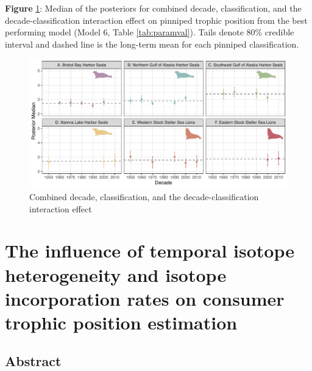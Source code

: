 \documentclass [11pt, proquest] {uwthesis}[2015/03/03]
\begin{document}
\textbf{Figure} \ref{fig:full}: Median of the posteriors for combined
decade, classification, and the decade-classification interaction effect
on pinniped trophic position from the best performing model (Model 6,
Table \ref{tab:paramval}). Tails denote 80\% credible interval and
dashed line is the long-term mean for each pinniped classification.
\newline 
\begin{figure}[h]
\centering
  \includegraphics[width=1\textwidth]{figure/Ch4/Figure6.pdf}
  \caption{Combined decade, classification, and the decade-classification interaction effect}
  \label{fig:full}
\end{figure}
\clearpage

\chapter{The influence of temporal isotope heterogeneity and isotope
incorporation rates on consumer trophic position
estimation}\label{the-influence-of-temporal-isotope-heterogeneity-and-isotope-incorporation-rates-on-consumer-trophic-position-estimation}

\section{Abstract}\label{abstract-4}
\end{document}
